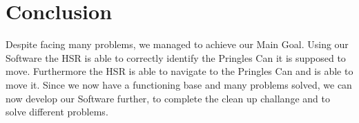 \documentclass[main.tex]{subfiles}
\begin{document}
	
	\chapter{Conclusion}
	Despite facing many problems, we managed to achieve our Main Goal.
	Using our Software the HSR is able to correctly identify the Pringles Can it is supposed to move.
	Furthermore the HSR is able to navigate to the Pringles Can and is able to move it.
	Since we now have a functioning base and many problems solved, we can now develop our Software further, to complete the clean up challange and to solve different problems.
	
\end{document}
